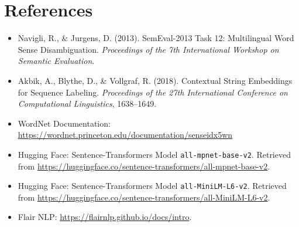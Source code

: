 \documentclass[11pt]{article}
\begin{document}
\section*{References}
\begin{itemize}
    \item Navigli, R., \& Jurgens, D. (2013). SemEval-2013 Task 12: Multilingual Word Sense Disambiguation. \emph{Proceedings of the 7th International Workshop on Semantic Evaluation}.
    \item Akbik, A., Blythe, D., \& Vollgraf, R. (2018). Contextual String Embeddings for Sequence Labeling. \emph{Proceedings of the 27th International Conference on Computational Linguistics}, 1638--1649.
    \item WordNet Documentation: \url{https://wordnet.princeton.edu/documentation/senseidx5wn}
    \item Hugging Face: Sentence-Transformers Model \texttt{all-mpnet-base-v2}. Retrieved from \url{https://huggingface.co/sentence-transformers/all-mpnet-base-v2}.
    \item Hugging Face: Sentence-Transformers Model \texttt{all-MiniLM-L6-v2}. Retrieved from \url{https://huggingface.co/sentence-transformers/all-MiniLM-L6-v2}.
    \item Flair NLP:  \url{https://flairnlp.github.io/docs/intro}.
\end{itemize}
\end{document}
